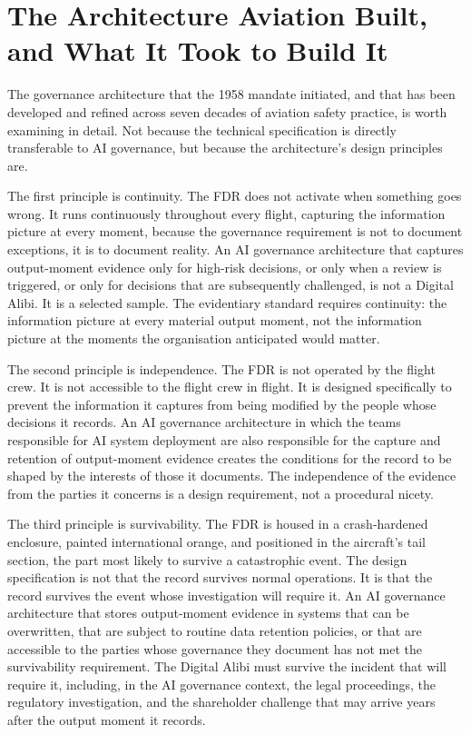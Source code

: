 \scenebreak

\section{The Architecture Aviation Built, and What It Took to Build It}

The governance architecture that the 1958 mandate initiated, and that has been developed and refined across seven decades of aviation safety practice, is worth examining in detail. Not because the technical specification is directly transferable to AI governance, but because the architecture's design principles are.

The first principle is continuity. The FDR does not activate when something goes wrong. It runs continuously throughout every flight, capturing the information picture at every moment, because the governance requirement is not to document exceptions, it is to document reality. An AI governance architecture that captures output-moment evidence only for high-risk decisions, or only when a review is triggered, or only for decisions that are subsequently challenged, is not a Digital Alibi. It is a selected sample. The evidentiary standard requires continuity: the information picture at every material output moment, not the information picture at the moments the organisation anticipated would matter.

The second principle is independence. The FDR is not operated by the flight crew. It is not accessible to the flight crew in flight. It is designed specifically to prevent the information it captures from being modified by the people whose decisions it records. An AI governance architecture in which the teams responsible for AI system deployment are also responsible for the capture and retention of output-moment evidence creates the conditions for the record to be shaped by the interests of those it documents. The independence of the evidence from the parties it concerns is a design requirement, not a procedural nicety.

The third principle is survivability. The FDR is housed in a crash-hardened enclosure, painted international orange, and positioned in the aircraft's tail section, the part most likely to survive a catastrophic event. The design specification is not that the record survives normal operations. It is that the record survives the event whose investigation will require it. An AI governance architecture that stores output-moment evidence in systems that can be overwritten, that are subject to routine data retention policies, or that are accessible to the parties whose governance they document has not met the survivability requirement. The Digital Alibi must survive the incident that will require it, including, in the AI governance context, the legal proceedings, the regulatory investigation, and the shareholder challenge that may arrive years after the output moment it records.

